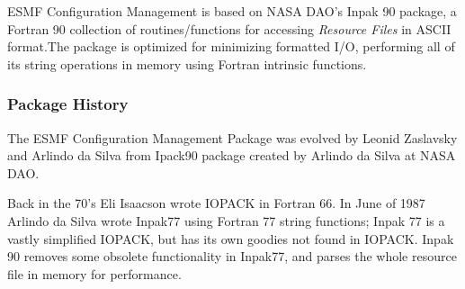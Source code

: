 

      ESMF Configuration Management is based on NASA DAO's 
      Inpak 90 package, a Fortran 90 collection of routines/functions
      for accessing {\em Resource Files} in ASCII format.The package 
      is optimized for minimizing formatted I/O, performing all of its 
      string operations in memory using Fortran intrinsic functions.\\

    \subsubsection{Package History}
       The ESMF Configuration Management Package was evolved by
       Leonid Zaslavsky and Arlindo da Silva from Ipack90 package
       created by Arlindo da Silva at NASA DAO.

       Back in the 70's Eli Isaacson wrote IOPACK in Fortran
       66.  In June of 1987 Arlindo da Silva wrote Inpak77 using
       Fortran 77 string functions; Inpak 77 is a vastly
       simplified IOPACK, but has its own goodies not found in
       IOPACK.  Inpak 90 removes some obsolete functionality in
       Inpak77, and parses the whole resource file in memory for
       performance.

